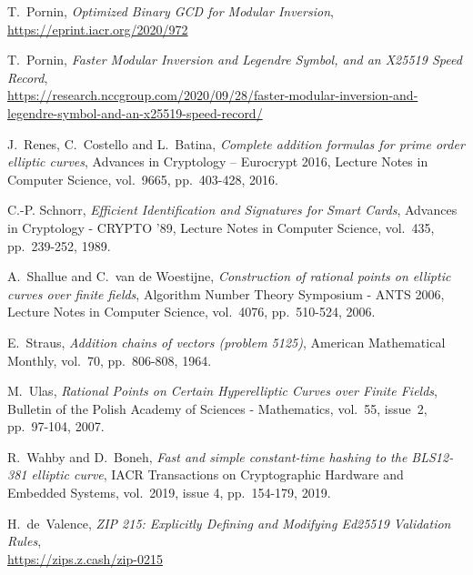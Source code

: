 \documentclass{llncs}
\begin{document}
\begin{thebibliography}{20}
T.~Pornin,
\emph{Optimized Binary GCD for Modular Inversion},\\
\url{https://eprint.iacr.org/2020/972}

T.~Pornin,
\emph{Faster Modular Inversion and Legendre Symbol, and an X25519 Speed
Record},\\
\url{https://research.nccgroup.com/2020/09/28/faster-modular-inversion-and-legendre-symbol-and-an-x25519-speed-record/}

J.~Renes, C.~Costello and L.~Batina,
\emph{Complete addition formulas for prime order elliptic curves},
Advances in Cryptology – Eurocrypt 2016, Lecture Notes in Computer Science,
vol.~9665, pp.~403-428, 2016.

C.-P. Schnorr,
\emph{Efficient Identification and Signatures for Smart Cards},
Advances in Cryptology - CRYPTO '89, Lecture Notes in Computer Science,
vol.~435, pp.~239-252, 1989.

A.~Shallue and C.~van de Woestijne,
\emph{Construction of rational points on elliptic curves over finite
fields},
Algorithm Number Theory Symposium - ANTS 2006, Lecture Notes in Computer
Science, vol.~4076, pp.~510-524, 2006.

E.~Straus,
\emph{Addition chains of vectors (problem 5125)},
American Mathematical Monthly, vol.~70, pp.~806-808, 1964.

M.~Ulas,
\emph{Rational Points on Certain Hyperelliptic Curves over Finite Fields},
Bulletin of the Polish Academy of Sciences - Mathematics, vol.~55,
issue~2, pp.~97-104, 2007.

R.~Wahby and D.~Boneh,
\emph{Fast and simple constant-time hashing to the BLS12-381 elliptic curve},
IACR Transactions on Cryptographic Hardware and Embedded Systems,
vol.~2019, issue 4, pp.~154-179, 2019.

H.~de~Valence,
\emph{ZIP 215: Explicitly Defining and Modifying Ed25519 Validation Rules},\\
\url{https://zips.z.cash/zip-0215}

\end{thebibliography}

\end{document}
